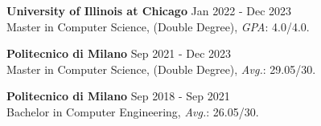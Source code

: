 
\noindent
\textbf{University of Illinois at Chicago} \hfill Jan 2022 - Dec 2023 \\
Master in Computer Science, (Double Degree), \textit{GPA}: 4.0/4.0.


\noindent
\textbf{Politecnico di Milano} \hfill Sep 2021 - Dec 2023 \\
Master in Computer Science, (Double Degree), \textit{Avg.}: 29.05/30.


\noindent
\textbf{Politecnico di Milano} \hfill Sep 2018 - Sep 2021 \\
Bachelor in Computer Engineering, \textit{Avg.}: 26.05/30.


